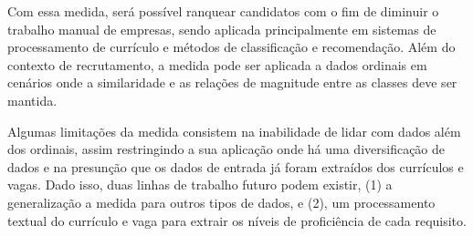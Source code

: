 \documentclass[preprint,12pt]{elsarticle}
\begin{document}
Com essa medida, será possível ranquear candidatos com o fim de diminuir o trabalho manual de empresas, sendo aplicada principalmente em sistemas de processamento de currículo e métodos de classificação e recomendação. Além do contexto de recrutamento, a medida pode ser aplicada a dados ordinais em cenários onde a similaridade e as relações de magnitude entre as classes deve ser mantida.

Algumas limitações da medida consistem na inabilidade de lidar com dados além dos ordinais, assim restringindo a sua aplicação onde há uma diversificação de dados e na presunção que os dados de entrada já foram extraídos dos currículos e vagas. Dado isso, duas linhas de trabalho futuro podem existir, (1) a generalização a medida para outros tipos de dados, e (2), um processamento textual do currículo e vaga para extrair os níveis de proficiência de cada requisito.

 


\appendix
\end{document}
